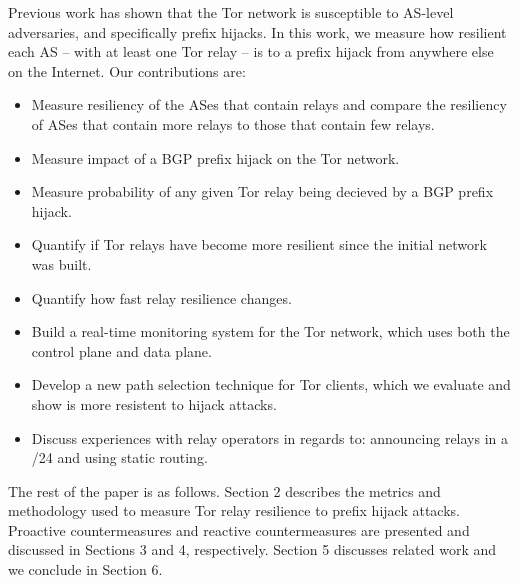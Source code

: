 Previous work has shown that the Tor network is susceptible to AS-level adversaries, and specifically prefix hijacks.  In this work, we measure how resilient each AS -- with at least one Tor relay -- is to a prefix hijack from anywhere else on the Internet.  Our contributions are:

\begin{itemize}
\item Measure resiliency of the ASes that contain relays and compare the resiliency of ASes that contain more relays to those that contain few relays.
\item Measure impact of a BGP prefix hijack on the Tor network.
\item Measure probability of any given Tor relay being decieved by a BGP prefix hijack.
\item Quantify if Tor relays have become more resilient since the initial network was built.
\item Quantify how fast relay resilience changes.
\item Build a real-time monitoring system for the Tor network, which uses both the control plane and data plane.
\item Develop a new path selection technique for Tor clients, which we evaluate and show is more resistent to hijack attacks.
\item Discuss experiences with relay operators in regards to: announcing relays in a /24 and using static routing.
\end{itemize}

The rest of the paper is as follows.  Section 2 describes the metrics and methodology used to measure Tor relay resilience to prefix hijack attacks.  Proactive countermeasures and reactive countermeasures are presented and discussed in Sections 3 and 4, respectively.  Section 5 discusses related work and we conclude in Section 6.
